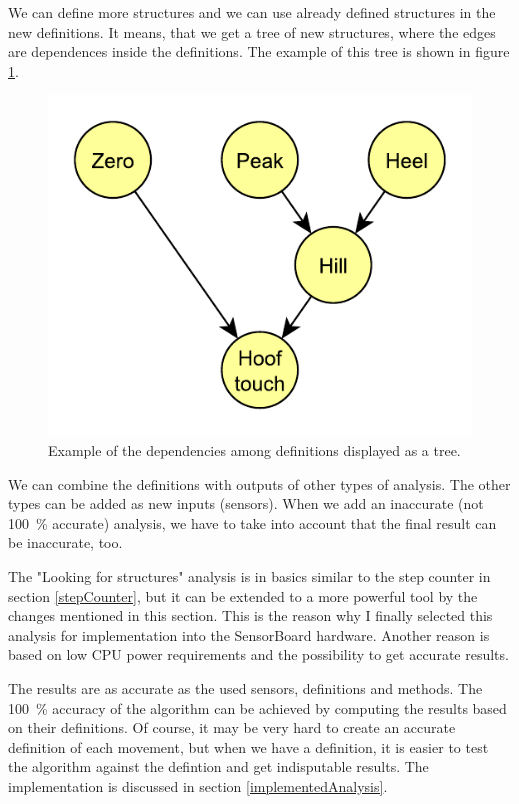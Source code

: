 We can define more structures and we can use already defined structures in the new definitions. It means, that we get a tree of new structures, where the edges are dependences inside the definitions. The example of this tree is shown in figure \ref{fig:definitionTree}.

\begin{figure}
	\centering
	\label{fig:definitionTree}
	\caption{Example of the dependencies among definitions displayed as a tree.}
	\includegraphics[scale=1]{img/definitionTree.pdf}
\end{figure}

We can combine the definitions with outputs of other types of analysis. The other types can be added as new inputs (sensors). When we add an inaccurate (not \SI{100}{\%} accurate) analysis, we have to take into account that the final result can be inaccurate, too.

The "Looking for structures" analysis is in basics similar to the step counter in section \ref{stepCounter}, but it can be extended to a more powerful tool by the changes mentioned in this section. This is the reason why I finally selected this analysis for implementation into the SensorBoard hardware. Another reason is based on low \ac{CPU} power requirements and the possibility to get accurate results.

The results are as accurate as the used sensors, definitions and methods. The \SI{100}{\%} accuracy of the algorithm can be achieved by computing the results based on their definitions. Of course, it may be very hard to create an accurate definition of each movement, but when we have a definition, it is easier to test the algorithm against the defintion and get indisputable results. The implementation is discussed in section \ref{implementedAnalysis}.


